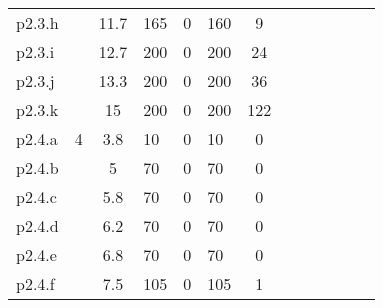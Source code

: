 \begin{table}[H]
\begin{tabularx}{\textwidth}{lXcXlXcXcXcXc}
p2.3.h                                                 &                             & 11.7                                               & 165                 & 0                    & 160               & 9                  \\
p2.3.i                                                 &                             & 12.7                                               & 200                 & 0                    & 200               & 24                 \\
p2.3.j                                                 &                             & 13.3                                               & 200                 & 0                    & 200               & 36                 \\
p2.3.k                                                 &                             & 15                                                 & 200                 & 0                    & 200               & 122                \\ \hline
p2.4.a                                                 & 4                           & 3.8                                                & 10                  & 0                    & 10                & 0                  \\
p2.4.b                                                 &                             & 5                                                  & 70                  & 0                    & 70                & 0                  \\
p2.4.c                                                 &                             & 5.8                                                & 70                  & 0                    & 70                & 0                  \\
p2.4.d                                                 &                             & 6.2                                                & 70                  & 0                    & 70                & 0                  \\
p2.4.e                                                 &                             & 6.8                                                & 70                  & 0                    & 70                & 0                  \\
p2.4.f                                                 &                             & 7.5                                                & 105                 & 0                    & 105               & 1                  \\

\end{tabularx}
\end{table}
